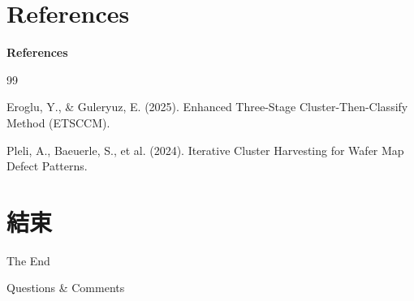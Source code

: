 \documentclass[12pt,aspectratio=43]{beamer}
\begin{document}
\section{References}

\begin{frame}{\textbf{References}}
\linespread{1.5}

\footnotesize

\begin{thebibliography}{99}

  Eroglu, Y., \& Guleryuz, E. (2025).
  \newblock Enhanced Three-Stage Cluster-Then-Classify Method (ETSCCM).

  Pleli, A., Baeuerle, S., et al. (2024).
  \newblock Iterative Cluster Harvesting for Wafer Map Defect Patterns.

\end{thebibliography}

\end{frame}

\section*{結束}

\begin{frame}[plain] %
	\begin{center}
		{\Huge The End}
		\bigskip\bigskip 

		{\LARGE Questions  \&  Comments}
	\end{center}
\end{frame}
\end{document}
